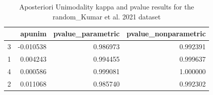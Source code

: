 \begin{table}
\caption{Aposteriori Unimodality kappa and pvalue results for the random_Kumar et al. 2021 dataset}
\label{tab:results_random_kumar}
\begin{tabular}{lrrr}
\toprule
 & apunim & pvalue\_parametric & pvalue\_nonparametric \\
\midrule
3 & -0.010538 & 0.986973 & 0.992391 \\
1 & 0.004243 & 0.994455 & 0.999637 \\
4 & 0.000586 & 0.999081 & 1.000000 \\
2 & 0.011068 & 0.985740 & 0.992302 \\
\bottomrule
\end{tabular}
\end{table}
